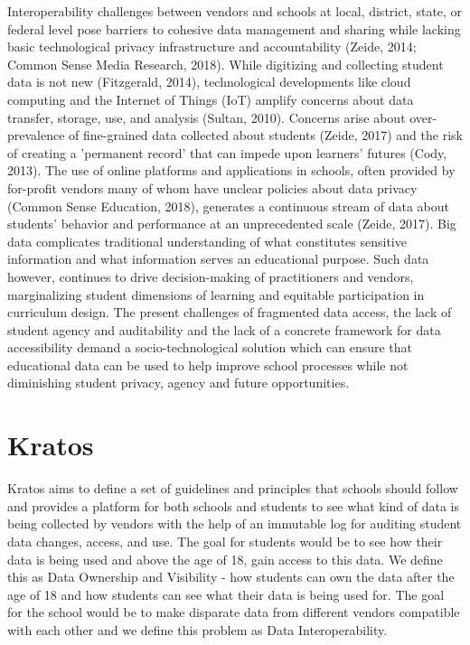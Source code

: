 \documentclass{article}
\begin{document}
Interoperability challenges between vendors and schools at local, district, state, or federal level pose barriers to cohesive data management and sharing while lacking basic technological privacy infrastructure and accountability (Zeide, 2014; Common Sense Media Research, 2018). While digitizing and collecting student data is not new (Fitzgerald, 2014), technological developments like cloud computing and the Internet of Things (IoT) amplify concerns about data transfer, storage, use, and analysis (Sultan, 2010).
\bigbreak
Concerns arise about over-prevalence of fine-grained data collected about students (Zeide, 2017) and the risk of creating a 'permanent record' that can impede upon learners' futures (Cody, 2013). The use of online platforms and applications in schools, often provided by for-profit vendors many of whom have unclear policies about data privacy (Common Sense Education, 2018), generates a continuous stream of data about students' behavior and performance at an unprecedented scale (Zeide, 2017). Big data complicates traditional understanding of what constitutes sensitive information and what information serves an educational purpose. Such data however, continues to drive decision-making of practitioners and vendors, marginalizing student dimensions of learning and equitable participation in curriculum design.
\bigbreak
The present challenges of fragmented data access, the lack of student agency and auditability and the lack of a concrete framework for data accessibility demand a socio-technological solution which can ensure that educational data can be used to help improve school processes while not diminishing student privacy, agency and future opportunities.

\section{Kratos}
Kratos aims to define a set of guidelines and principles that schools should follow and provides a platform for both schools and students to see what kind of data is being collected by vendors with the help of an immutable log for auditing student data changes, access, and use. The goal for students would be to see how their data is being used and above the age of 18, gain access to this data. We define this as Data Ownership and Visibility - how students can own the data after the age of 18 and how students can see what their data is being used for. The goal for the school would be to make disparate data from different vendors compatible with each other and we define this problem as Data Interoperability.
\end{document}
